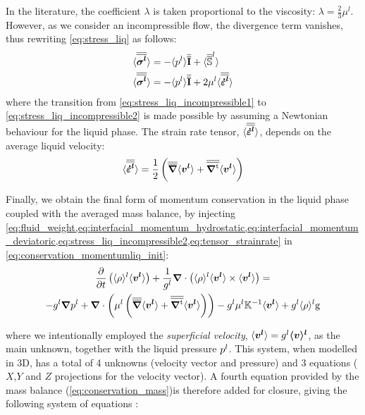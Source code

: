 In the literature, the coefficient $\lambda$ is taken proportional to the 
viscosity: $\lambda = \frac{2}{3} \mu^l $. However, as we consider an incompressible flow, the divergence 
term vanishes, thus rewriting \cref{eq:stress_liq} as follows:
\begin{subequations} 
\begin{align}
\label{eq:stress_liq_incompressible1}
& \avg{\sigmal} = - \avg{\pl} \I + \avg{\mat{\mathbb{S}}^{l}} \\
\label{eq:stress_liq_incompressible2}
& \avg{\sigmal} = - \avg{\pl} \I + 2 \mul \strainrateliq 
\end{align}
\end{subequations}
where the transition from \cref{eq:stress_liq_incompressible1} to \cref{eq:stress_liq_incompressible2} is made
possible by assuming a Newtonian behaviour for the liquid phase. The strain rate tensor, $\langle {\overline{\overline{\ensuremath{\boldsymbol{\dot{\varepsilon}^l}}}}} \rangle$, depends on 
the average liquid velocity:
\begin{align}
\label{eq:tensor_strainrate}
\strainrateliq = \frac{1}{2} \brac{\nabmat \vit  +  \nabmattransp \vit}
\end{align}

Finally, we obtain the final form of momentum conservation in the liquid phase coupled with the averaged 
mass balance, by injecting \cref{eq:fluid_weight,eq:interfacial_momentum_hydrostatic,eq:interfacial_momentum_deviatoric,eq:stress_liq_incompressible2,eq:tensor_strainrate}
in \cref{eq:conservation_momentumliq_init}:
\begin{multline}
\label{eq:conservation_momentumliq}
 \temp{ \rhol \vit } + \frac{1}{\gl} \nabvec \cdot \brac{\rhol \vit \times \vit} = \\
	  - \gl\nabvec \pl + \nabvec \cdot \brac{\mul  \brac{\nabmat \vit + \nabmattransp \vit}}
	  - \gl \mul \K^{-1} \vit + \gl \rhol \gravity
\end{multline}

where we intentionally employed the \emph{superficial velocity}, $\langle \boldsymbol{v^l} \rangle = {g^l} \boldsymbol{\langle v \rangle^l}$, as the main unknown, together with the liquid pressure ${p^l}$.
This system, when modelled in 3D, has a total of 4 unknowns (velocity vector and pressure) and 3 equations ($X$,$Y$ and $Z$ projections for the velocity vector).
A fourth equation provided by the mass balance (\cref{eq:conservation_mass})is therefore added for closure, giving the following system of equations :

